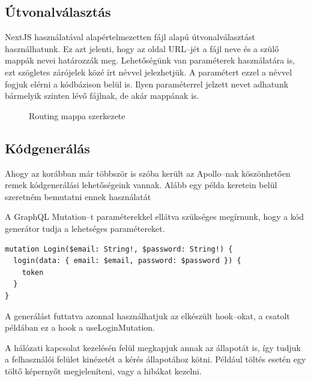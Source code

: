 \subsection{Útvonalválasztás}
NextJS használatával alapértelmezetten fájl alapú útvonalválasztást használhatunk.
Ez azt jelenti, hogy az oldal URL–jét a fájl neve és a szülő mappák nevei határozzák meg.
Lehetőségünk van paraméterek használatára is, ezt szögletes zárójelek közé írt névvel jelezhetjük.
A paramétert ezzel a névvel fogjuk elérni a kódbázison belül is.
Ilyen paraméterrel jelzett nevet adhatunk bármelyik szinten lévő fájlnak, de akár mappának is.

\begin{figure}
	\caption{Routing mappa szerkezete}
	\label{fig:next}
\end{figure}


\subsection{Kódgenerálás}

Ahogy az korábban már többször is szóba került az Apollo–nak köszönhetően remek kódgenerálási lehetőségeink vannak.
Alább egy példa keretein belül szeretném bemutatni ennek használatát

A GraphQL Mutation–t paraméterekkel ellátva szükséges megírnunk, hogy a kód generátor tudja a lehetséges paramétereket. 
\begin{lstlisting}[style=ES6]
mutation Login($email: String!, $password: String!) {
  login(data: { email: $email, password: $password }) {
    token
  }
}
\end{lstlisting}

A generálást futtatva azonnal használhatjuk az elkészült hook–okat, a csatolt példában ez a hook a useLoginMutation.

A hálózati kapcsolat kezelésén felül megkapjuk annak az állapotát is, így tudjuk a felhasználói felület kinézetét a kérés állapotához kötni.
Például töltés esetén egy töltő képernyőt megjeleníteni, vagy a hibákat kezelni.


